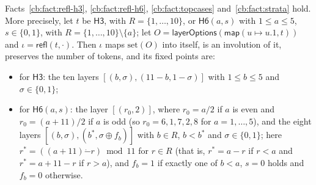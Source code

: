 \begin{proposition}\label{cb:prop:refl}
Facts~\ref{cb:fact:refl-h3}, \ref{cb:fact:refl-h6}, \ref{cb:fact:topcases} and~\ref{cb:fact:strata} hold. More
precisely, let $t$ be $\mathsf{H3}$, with $R=\{1,\dots,10\}$, or $\mathsf{H6}(a,s)$ with $1\le a\le5$, $s\in\{0,1\}$,
with $R=\{1,\dots,10\}\setminus\{a\}$; let $O=\mathsf{layerOptions}(\mathsf{map}(u\mapsto u.1,t))$ and
$\iota=\mathsf{refl}(t,\cdot)$. Then $\iota$ maps $\mathrm{set}(O)$ into itself, is an involution of it, preserves the
number of tokens, and its fixed points are:
\begin{itemize}
\item for $\mathsf{H3}$: the ten layers $[(b,\sigma),(11-b,1-\sigma)]$ with $1\le b\le5$ and $\sigma\in\{0,1\}$;
\item for $\mathsf{H6}(a,s)$: the layer $[(r_0,2)]$, where $r_0=a/2$ if $a$ is even and $r_0=(a+11)/2$ if $a$ is odd
  (so $r_0=6,1,7,2,8$ for $a=1,\dots,5$), and the eight layers $[(b,\sigma),(b^*,\sigma\oplus f_b)]$ with $b\in R$,
  $b<b^*$ and $\sigma\in\{0,1\}$; here $r^*=((a+11)\mathbin{\dot-}r)\bmod11$ for $r\in R$ (that is, $r^*=a-r$ if $r<a$
  and $r^*=a+11-r$ if $r>a$), and $f_b=1$ if exactly one of $b<a$, $s=0$ holds and $f_b=0$ otherwise.
\end{itemize}
\end{proposition}

